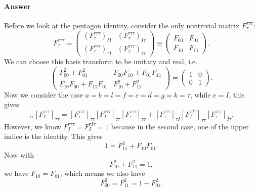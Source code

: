 \documentclass{book}
\begin{document}
\paragraph{Answer}
Before we look at the pentagon identity, consider the only nontrivial matrix $F_{\tau }^{\tau \tau \tau }$:
\begin{equation*}
F_{\tau }^{\tau \tau \tau } =\begin{pmatrix}
(F_{\tau }^{\tau \tau \tau } )_{II} & (F_{\tau }^{\tau \tau \tau } )_{I\tau }\\
(F_{\tau }^{\tau \tau \tau } )_{\tau I} & (F_{\tau }^{\tau \tau \tau } )_{\tau \tau }
\end{pmatrix} \equiv \begin{pmatrix}
F_{00} & F_{01}\\
F_{10} & F_{11}
\end{pmatrix} .
\end{equation*}
We can choose this basis transform to be unitary and real, i.e.
\begin{equation*}
\begin{pmatrix}
F_{00}^{2} +F_{01}^{2} & F_{00} F_{10} +F_{01} F_{11}\\
F_{10} F_{00} +F_{11} F_{01} & F_{10}^{2} +F_{11}^{2}
\end{pmatrix} =\begin{pmatrix}
1 & 0\\
0 & 1
\end{pmatrix} .
\end{equation*}
Now we consider the case $a=b=l=f=c=d=g=k=\tau $, while $e=I$, this gives
\begin{equation*}
[F_{I}^{\tau \tau \tau } ]_{\tau \tau } [F_{I}^{\tau \tau \tau } ]_{\tau \tau } =[F_{\tau }^{\tau \tau \tau } ]_{\tau \tau } [F_{I}^{\tau \tau \tau } ]_{\tau \tau } [F_{\tau }^{\tau \tau \tau } ]_{\tau \tau } +[F_{\tau }^{\tau \tau \tau } ]_{\tau I} [F_{I}^{\tau I\tau } ]_{\tau \tau } [F_{\tau }^{\tau \tau \tau } ]_{I\tau } .
\end{equation*}
However, we know $F_{I}^{\tau \tau \tau } =F_{I}^{\tau I\tau } =1$ because in the second case, one of the upper indice is the identity. This gives
\begin{equation*}
1=F_{11}^{2} +F_{10} F_{01} .
\end{equation*}
Now with
\begin{equation*}
F_{10}^{2} +F_{11}^{2} =1,
\end{equation*}
we have $F_{10} =F_{01}$, which means we also have
\begin{equation*}
F_{00}^{2} =F_{11}^{2} =1-F_{01}^{2} .
\end{equation*}
\end{document}
